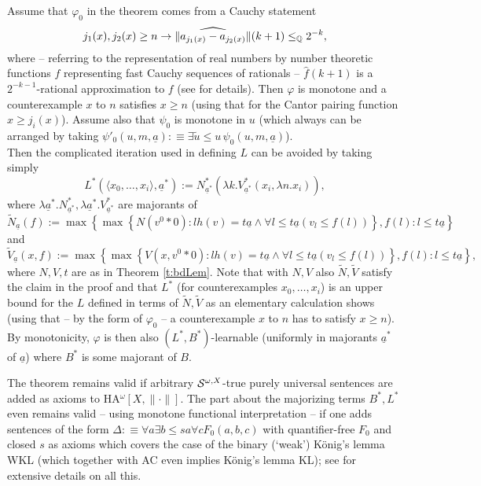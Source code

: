 \begin{rmk} \label{simple-L}
Assume that $\varphi_0$  in the theorem comes from a Cauchy statement 
\[ j_1(x),j_2(x)\ge n\to \widehat{\| 
a_{j_1(x)}-a_{j_2(x)}\|}(k+1)\le_{\mathbb{Q}} 
2^{-k}, \] where -- referring to the representation of real numbers 
by number theoretic functions $f$ representing fast Cauchy sequences of 
rationals -- $\widehat{f}(k+1)$ is a $2^{-k-1}$-rational approximation to $f$ 
(see \cite{Kohlenbach08} for details).  Then 
$\varphi$ is monotone and a counterexample $x$ to $n$ satisfies 
$x\ge n$ (using that for the Cantor pairing function $x\ge j_i(x)$). 
Assume also that $\psi_0$ is 
monotone in $u$ (which always can be arranged by taking 
$\psi'_0(u,m,\underline{a}):\equiv \exists \tilde{u}\le u\,\psi_0
(u,m,\underline{a})$). \\ 
Then the complicated iteration used in defining 
$L$ can be avoided by taking simply 
\[ L^*(\langle x_0,\ldots,x_i\rangle,\underline{a}^*):= 
N^*_{\underline{a}^*}(\lambda k.V^*_{\underline{a}^*}(x_i,
\lambda n.x_i)), \] 
where $\lambda \underline{a}^*.N^*_{\underline{a}^*},\lambda \underline{a}^*.
V^*_{\underline{a}^*}$ are majorants of 
\[ \tilde{N}_{\underline{a}}(f):=\max\left\{ \max\left\{ 
N(v^0*0):lh(v)=t\underline{a}\wedge \forall l\le t\underline{a}(v_l\le f(l))
\right\},f(l):l\le t\underline{a}\right\}\] and 
\[ \tilde{V}_{\underline{a}}(x,f):=\max\left\{ \max\left\{ 
V(x,v^0*0):lh(v)=t\underline{a}\wedge \forall l\le t\underline{a}(v_l\le f(l))
\right\},f(l):l\le t\underline{a}\right\},\] 
where $N,V,t$ are as in Theorem \ref{t:bdLem}. Note that with $N,V$ also 
$\tilde{N},\tilde{V}$ satisfy the claim in the proof and that $L^*$ 
(for counterexamples $x_0,\ldots,x_i$) is 
an upper bound for the $L$ defined in terms of $\tilde{N},\tilde{V}$ as 
an elementary calculation shows (using that -- by the form of 
$\varphi_0$ -- a counterexample $x$ to $n$ has to satisfy $x\ge n$). 
By monotonicity, $\varphi$ is then also $(L^*,B^*)$-learnable (uniformly 
in majorants $\underline{a}^*$ of $\underline{a}$) where $B^*$ is some 
majorant of $B.$ 
\end{rmk}  
\begin{rmk} The theorem remains valid if arbitrary ${\cal S}^{\omega,X }$-true 
purely universal sentences are added as axioms to 
{\rm HA$^{\omega}[X,\|\cdot\|]$}. The part about the majorizing terms $B^*,L^*$ 
even remains valid -- using monotone functional interpretation -- 
if one adds sentences of the form $\Delta:\equiv 
\forall a\exists b\le sa\forall c F_0(a,b,c)$ with quantifier-free 
$F_0$ and closed $s$ as axioms which covers the case of the binary (`weak') K\"onig's lemma 
WKL (which together with AC even implies K\"onig's lemma KL); see 
\cite{Kohlenbach08} for extensive details on all this.
\end{rmk}
